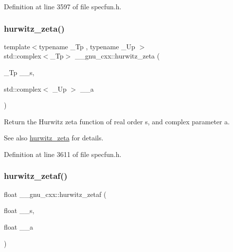 Definition at line 3597 of file specfun.\+h.

\mbox{\label{group__mathsf__gnu_gaa7f0d1fbba9d2ce07a30d907302d527f}} 
\subsubsection{\texorpdfstring{hurwitz\+\_\+zeta()}{hurwitz\_zeta()}\hspace{0.1cm}{\footnotesize\ttfamily [2/2]}}
{\footnotesize\ttfamily template$<$typename \+\_\+\+Tp , typename \+\_\+\+Up $>$ \\
std\+::complex$<$\+\_\+\+Tp$>$ \+\_\+\+\_\+gnu\+\_\+cxx\+::hurwitz\+\_\+zeta (\begin{DoxyParamCaption}\item[{\+\_\+\+Tp}]{\+\_\+\+\_\+s,  }\item[{std\+::complex$<$ \+\_\+\+Up $>$}]{\+\_\+\+\_\+a }\end{DoxyParamCaption})}

Return the Hurwitz zeta function of real order {\ttfamily s}, and complex parameter {\ttfamily a}.

\begin{DoxySeeAlso}{See also}
\hyperlink{group__mathsf__gnu_ga7b167ce1c8d9aa6aad40fc83a95733bd}{hurwitz\+\_\+zeta} for details. 
\end{DoxySeeAlso}


Definition at line 3611 of file specfun.\+h.

\mbox{\label{group__mathsf__gnu_gaa745d7f2edde060ed2f22817ad89df1f}} 
\subsubsection{\texorpdfstring{hurwitz\+\_\+zetaf()}{hurwitz\_zetaf()}}
{\footnotesize\ttfamily float \+\_\+\+\_\+gnu\+\_\+cxx\+::hurwitz\+\_\+zetaf (\begin{DoxyParamCaption}\item[{float}]{\+\_\+\+\_\+s,  }\item[{float}]{\+\_\+\+\_\+a }\end{DoxyParamCaption})\hspace{0.3cm}{\ttfamily [inline]}}


